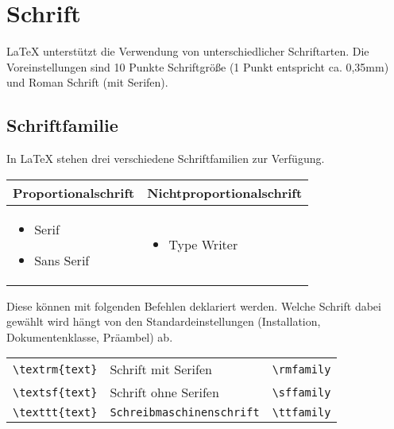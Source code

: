 \chapter{Schrift}
\LaTeX{} unterstützt die Verwendung von unterschiedlicher Schriftarten. Die Voreinstellungen sind 10 Punkte Schriftgröße (1 Punkt entspricht ca. 0,35mm) und Roman Schrift (mit Serifen).
\section{Schriftfamilie}
In \LaTeX{} stehen drei verschiedene Schriftfamilien zur Verfügung.
\begin{table}[H]
\centering
\begin{tabular}{| m{5cm} | m{5cm} |}
\hline
\multicolumn{1}{|c|}{Proportionalschrift} 	&\multicolumn{1}{|c|}{Nichtproportionalschrift}\\
\hline
\begin{itemize}
\item Serif
\item Sans Serif
\end{itemize}
& \begin{itemize}
\item Type Writer\end{itemize}\\
\hline
\end{tabular}
\end{table}
Diese können mit folgenden Befehlen deklariert werden. Welche Schrift dabei gewählt wird hängt von den Standardeinstellungen (Installation, Dokumentenklasse, Präambel) ab.
\begin{center}
\begin{tabular}{lll}
\verb=\textrm{text}=&\textrm{Schrift mit Serifen}&\verb=\rmfamily=\\
\verb=\textsf{text}=&\textsf{Schrift ohne Serifen}&\verb=\sffamily=\\
\verb=\texttt{text}=&\texttt{Schreibmaschinenschrift}&\verb=\ttfamily=\\
\end{tabular}
\end{center}
